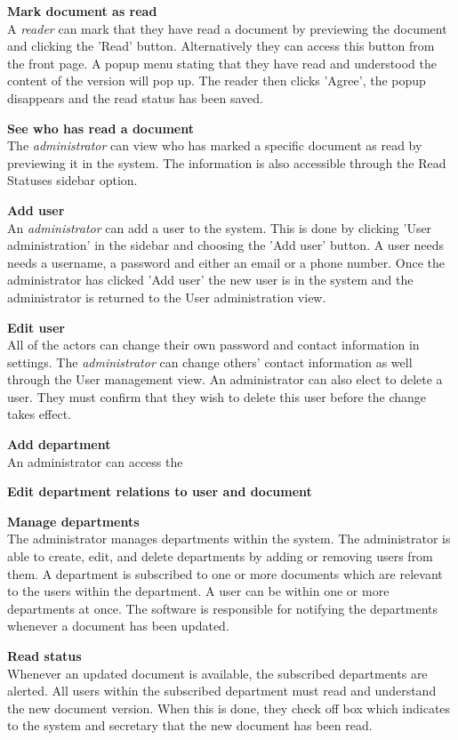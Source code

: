 \textbf{Mark document as read}
\\
A \textit{reader} can mark that they have read a document by previewing the document and clicking the 'Read' button. 
Alternatively they can access this button from the front page.
A popup menu stating that they have read and understood the content of the version will pop up.
The reader then clicks 'Agree', the popup disappears and the read status has been saved.

\textbf{See who has read a document}
\\
The \textit{administrator} can view who has marked a specific document as read by previewing it in the system.
The information is also accessible through the Read Statuses sidebar option.

\textbf{Add user}
\\
An \textit{administrator} can add a user to the system.
This is done by clicking 'User administration' in the sidebar and choosing the 'Add user' button.
A user needs needs a username, a password and either an email or a phone number.
Once the administrator has clicked 'Add user' the new user is in the system and the administrator is returned to the User administration view.

\textbf{Edit user}
\\
All of the actors can change their own password and contact information in settings.
The \textit{administrator} can change others' contact information as well through the User management view.
An administrator can also elect to delete a user.
They must confirm that they wish to delete this user before the change takes effect.


\textbf{Add department}
\\
An administrator can access the 

\textbf{Edit department relations to user and document}

\textbf{Manage departments}
\\
The administrator manages departments within the system.
The administrator is able to create, edit, and delete departments by adding or removing users from them.
A department is subscribed to one or more documents which are relevant to the users within the department.
A user can be within one or more departments at once.
The software is responsible for notifying the departments whenever a document has been updated.


\textbf{Read status}
\\
Whenever an updated document is available, the subscribed departments are alerted.
All users within the subscribed department must read and understand the new document version.
When this is done, they check off box which indicates to the system and secretary that the new document has been read.
